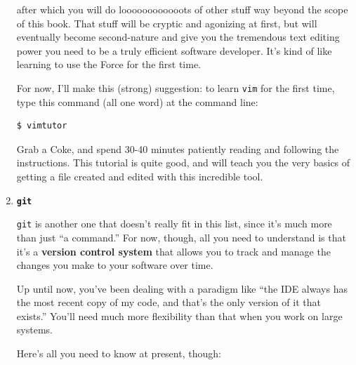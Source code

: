 \begin{enumerate}
after which you will do loooooooooooots of other stuff way beyond the scope of
this book. That stuff will be cryptic and agonizing at first, but will
eventually become second-nature and give you the tremendous text editing power
you need to be a truly efficient software developer. It's kind of like
learning to use the Force for the first time.

For now, I'll make this (strong) suggestion: to learn \texttt{vim} for the
first time, type this command (all one word) at the command line:

\begin{Verbatim}[fontsize=\small]
$ vimtutor
\end{Verbatim}

Grab a Coke, and spend 30-40 minutes patiently reading and following the
instructions. This tutorial is quite good, and will teach you the very basics
of getting a file created and edited with this incredible tool.

\bigline

\item \textbf{\texttt{git}}
\label{introduceGit}

\texttt{git} is another one that doesn't really fit in this list, since it's
much more than just ``a command.'' For now, though, all you need to understand
is that it's a \textbf{version control system} that allows you to track and
manage the changes you make to your software over time.

Up until now, you've been dealing with a paradigm like ``the IDE always has the
most recent copy of my code, and that's the only version of it that exists.''
You'll need much more flexibility than that when you work on large systems.

Here's all you need to know at present, though:


\end{enumerate}
